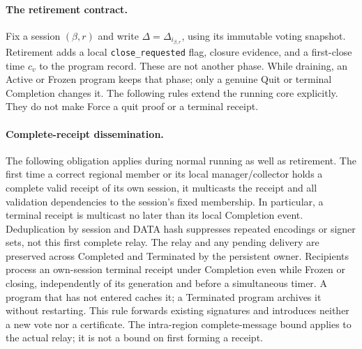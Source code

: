 \paragraph{The retirement contract.}
\label{sec:retirement}
Fix a session $(\beta,r)$ and write $\Delta=\Delta_{i_{\beta,r}}$,
using its immutable voting snapshot. Retirement adds a local
\texttt{close\_requested} flag, closure evidence, and a first-close time
$c_v$ to the program record. These are not another phase. While draining,
an Active or Frozen program keeps that phase; only a genuine Quit or
terminal Completion changes it. The following rules extend the running
core explicitly. They do not make Force a quit proof or a terminal receipt.

\paragraph{Complete-receipt dissemination.}
\label{sec:retirement-receipt-relay}
The following obligation applies during normal running as well as
retirement. The first time a correct regional member or its local
manager/collector holds a complete valid receipt of its own session,
it multicasts the receipt and all validation dependencies to the
session's fixed membership. In particular, a terminal receipt is
multicast no later than its local Completion event. Deduplication by
session and DATA hash suppresses repeated encodings or signer sets,
not this first complete relay. The relay and any pending delivery are
preserved across Completed and Terminated by the persistent owner.
Recipients process an own-session terminal receipt under Completion
even while Frozen or closing, independently of its generation and
before a simultaneous timer. A program that has not entered caches
it; a Terminated program archives it without restarting. This rule
forwards existing signatures and introduces neither a new vote nor a
certificate. The intra-region complete-message bound applies to the
actual relay; it is not a bound on first forming a receipt.

